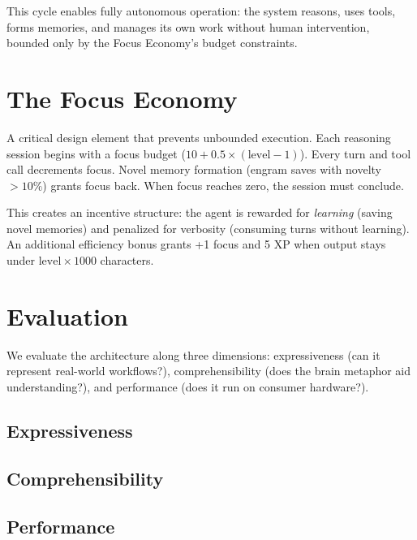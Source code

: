\documentclass[man,12pt,floatsintext]{apa7}
\begin{document}
This cycle enables fully autonomous operation: the system reasons, uses tools, forms
memories, and manages its own work without human intervention, bounded only by the
Focus Economy's budget constraints.

\section{The Focus Economy}

A critical design element that prevents unbounded execution. Each reasoning session begins
with a focus budget ($10 + 0.5 \times (\text{level} - 1)$). Every turn and tool call
decrements focus. Novel memory formation (engram saves with novelty $> 10\%$) grants
focus back. When focus reaches zero, the session must conclude.

This creates an incentive structure: the agent is rewarded for \emph{learning} (saving
novel memories) and penalized for verbosity (consuming turns without learning). An
additional efficiency bonus grants +1 focus and 5 XP when output stays under
$\text{level} \times 1000$ characters.

\section{Evaluation}
\label{sec:evaluation}

We evaluate the architecture along three dimensions: expressiveness (can it represent
real-world workflows?), comprehensibility (does the brain metaphor aid understanding?),
and performance (does it run on consumer hardware?).

\subsection{Expressiveness}


\subsection{Comprehensibility}


\subsection{Performance}
\end{document}
